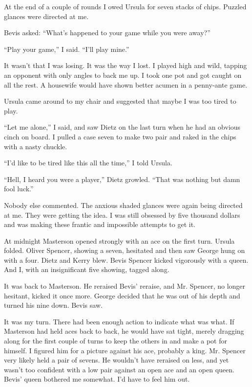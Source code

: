 \documentclass{novel}
\begin{document}
\scenestars

At the end of a couple of rounds I owed Ursula for seven stacks of chips. Puzzled glances were directed at me.

Bevis asked: “What’s happened to your game while you were away?”

“Play your game,” I said. “I’ll play mine.”

It wasn’t that I was losing. It was the way I lost. I played high and wild, tapping an opponent with only angles to back me up. I took one pot and got caught on all the rest. A housewife would have shown better acumen in a penny-ante game.

Ursula came around to my chair and suggested that maybe I was too tired to play.

“Let me alone,” I said, and saw Dietz on the last turn when he had an obvious cinch on board. I pulled a case seven to make two pair and raked in the chips with a nasty chuckle. 

“I’d like to be tired like this all the time,” I told Ursula.

“Hell, I heard you were a player,” Dietz growled. “That was nothing but damn fool luck.”

Nobody else commented. The anxious shaded glances were again being directed at me. They were getting the idea. I was still obsessed by five thousand dollars and was making these frantic and impossible attempts to get it.

At midnight Masterson opened strongly with an ace on the first turn. Ursula folded. Oliver Spencer, showing a seven, hesitated and then saw George hung on with a four. Dietz and Kerry blew. Bevis Spencer kicked vigorously with a queen. And I, with an insignificant five showing, tagged along.

It was back to Masterson. He reraised Bevis’ reraise, and Mr. Spencer, no longer hesitant, kicked it once more. George decided that he was out of his depth and turned his nine down. Bevis saw.

It was my turn. There had been enough action to indicate what was what. If Masterson had held aces back to back, he would have sat tight, merely dragging along for the first couple of turns to keep the others in and make a pot for himself. I figured him for a picture against his ace, probably a king. Mr. Spencer very likely held a pair of sevens. He wouldn’t have reraised on less, and yet wasn’t too confident with a low pair against an open ace and an open queen. Bevis’ queen bothered me somewhat. I’d have to feel him out.
\end{document}
